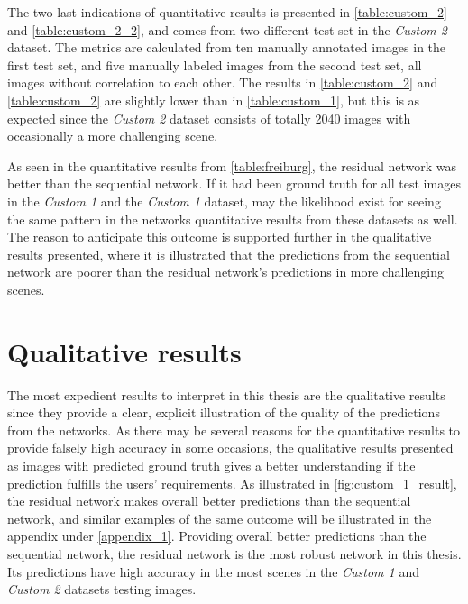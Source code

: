 \documentclass[USenglish]{ifimaster}  %
\begin{document}
The two last indications of quantitative results is presented in \cref{table:custom_2} and \cref{table:custom_2_2}, and comes from two different test set in the \textit{Custom 2} dataset. The metrics are calculated from ten manually annotated images in the first test set, and five manually labeled images from the second test set, all images without correlation to each other. The results in \cref{table:custom_2} and \cref{table:custom_2} are slightly lower than in \cref{table:custom_1}, but this is as expected since the \textit{Custom 2} dataset consists of totally 2040 images with occasionally a more challenging scene. 

As seen in the quantitative results from \cref{table:freiburg}, the residual network was better than the sequential network. If it had been ground truth for all test images in the \textit{Custom 1} and the \textit{Custom 1} dataset, may the likelihood exist for seeing the same pattern in the networks quantitative results from these datasets as well. The reason to anticipate this outcome is supported further in the qualitative results presented, where it is illustrated that the predictions from the sequential network are poorer than the residual network's predictions in more challenging scenes. 

\section{Qualitative results}
The most expedient results to interpret in this thesis are the qualitative results since they provide a clear, explicit illustration of the quality of the predictions from the networks. As there may be several reasons for the quantitative results to provide falsely high accuracy in some occasions, the qualitative results presented as images with predicted ground truth gives a better understanding if the prediction fulfills the users' requirements. As illustrated in \cref{fig:custom_1_result}, the residual network makes overall better predictions than the sequential network, and similar examples of the same outcome will be illustrated in the appendix under \cref{appendix_1}. Providing overall better predictions than the sequential network, the residual network is the most robust network in this thesis. Its predictions have high accuracy in the most scenes in the \textit{Custom 1} and \textit{Custom 2} datasets testing images.        
\end{document}
